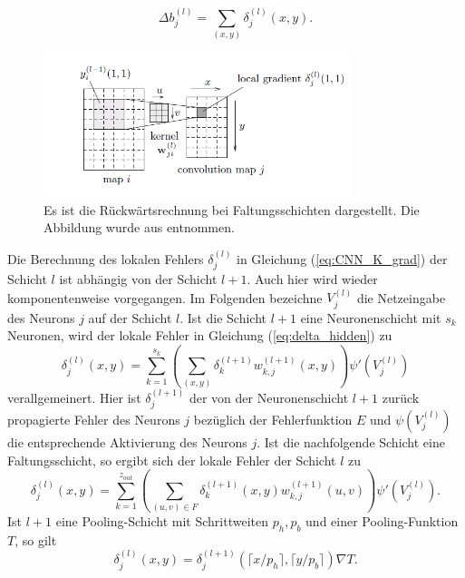 \begin{equation*}
    \Delta b_j^{(l)}= \sum_{(x,y)} \delta_j^{(l)}(x,y).
\end{equation*}

\begin{figure}[h]
    \includegraphics[width=0.8\textwidth]{pics/chapters/CCN/backprop_dudiss.png}
    \centering
    \caption[Rückwärtsrechnung bei CNN]{Es ist die Rückwärtsrechnung bei Faltungsschichten dargestellt. Die Abbildung wurde aus \cite{du_diss} entnommen.}
    \label{abb:error_conv}
\end{figure}
Die Berechnung des lokalen Fehlers $\delta_{j}^{(l)}$ in Gleichung (\ref{eq:CNN_K_grad}) der Schicht $l$ ist abhängig von der Schicht $l+1$. Auch hier wird wieder komponentenweise vorgegangen. Im Folgenden bezeichne $V_j^{(l)}$ die Netzeingabe des Neurons $j$ auf der Schicht $l$.
Ist die Schicht $l+1$ eine Neuronenschicht mit $s_k$ Neuronen, wird der lokale Fehler in Gleichung (\ref{eq:delta_hidden}) zu
\begin{equation*}
    \delta_j^{(l)}(x,y)=\sum_{k=1}^{s_{k}} \left(\sum_{(x,y)} \delta_k^{(l+1)} w_{k,j}^{(l+1)}(x,y)\right) \psi'(V_j^{(l)})
\end{equation*}
verallgemeinert. 
Hier ist $\delta_j^{(l+1)}$ der von der Neuronenschicht $l+1$ zurück propagierte Fehler des Neurons $j$ bezüglich der Fehlerfunktion $E$ und $\psi(V^{(l)}_j)$ die entsprechende Aktivierung des Neurons $j$.
Ist die nachfolgende Schicht eine Faltungsschicht, so ergibt sich der lokale Fehler der Schicht $l$ zu
\begin{equation*}
    \delta_j^{(l)}(x,y)=\sum_{k=1}^{z_{out}} \left(\sum_{(u,v) \in F} \delta_k^{(l+1)}(x,y) w_{k,j}^{(l+1)}(u,v)\right) \psi'(V_j^{(l)}).
\end{equation*}
Ist $l+1$ eine Pooling-Schicht mit Schrittweiten $p_h,p_b$ und einer Pooling-Funktion $T$, so gilt
\begin{equation}
    \label{eq:upsample1}
    \delta_j^{(l)}(x,y)=\delta_j^{(l+1)}(\lceil x/p_h \rceil ,\lceil y/p_b \rceil)\nabla T.
\end{equation}
